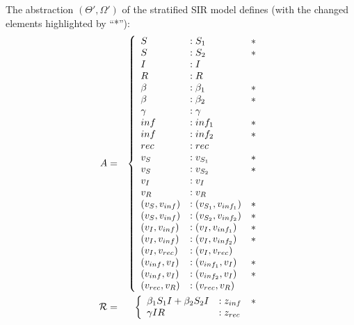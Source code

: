 \begin{example}\label{ex:abstraction}
    The abstraction $(\Theta', \Omega')$ of the stratified SIR model defines
    (with the changed elements highlighted by ``*''):
    \begin{eqnarray*}
        A &=& \left\{ 
            \begin{array}{lll}
                S &: S_1 &*\\
                S &: S_2&*\\
                I &: I\\
                R &: R\\
               \beta &: \beta_1&*\\
               \beta &: \beta_2&*\\
               \gamma &: \gamma\\
               inf&: inf_1&*\\
               inf&: inf_2&*\\
               rec&: rec\\
               v_S &: v_{S_1}&*\\
               v_S &: v_{S_2}&*\\
               v_I &: v_{I}\\
               v_R &: v_{R}\\
               (v_{S}, v_{inf}) &: (v_{S_1}, v_{inf_1})&*\\
               (v_{S}, v_{inf}) &: (v_{S_2}, v_{inf_2})&*\\
               (v_{I}, v_{inf}) &: (v_{I}, v_{inf_1})&*\\
               (v_{I}, v_{inf}) &: (v_{I}, v_{inf_2})&*\\
               (v_I, v_{rec}) &: (v_I, v_{rec})\\
               (v_{inf}, v_I) &: (v_{inf_1}, v_I)&*\\
               (v_{inf}, v_I) &: (v_{inf_2}, v_I)&*\\
               (v_{rec}, v_R) &: (v_{rec}, v_R)\\
            \end{array}\right.\\
            {\cal R} &=& \left\{ 
            \begin{array}{lll}
                \beta_1 S_1 I +  \beta_2 S_2 I& : z_{inf}&* \\
                \gamma I R & : z_{rec}\\
            \end{array}\right.\\
    \end{eqnarray*}
\end{example}

